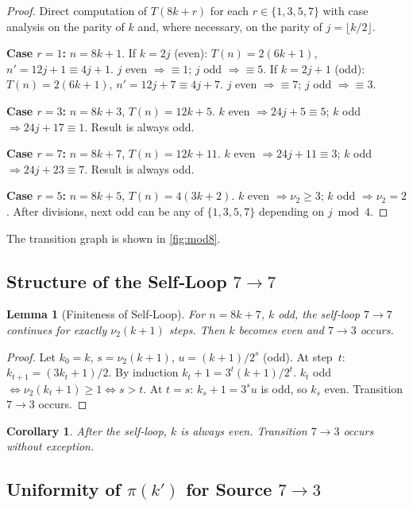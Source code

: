 \documentclass[12pt,a4paper]{article}
\newtheorem{lemma}[theorem]{Lemma}
\newtheorem{corollary}[theorem]{Corollary}
\theoremstyle{definition}
\theoremstyle{remark}
\begin{document}
\begin{proof}
Direct computation of $T(8k+r)$ for each $r\in\{1,3,5,7\}$ with case
analysis on the parity of $k$ and, where necessary, on the parity of
$j=\lfloor k/2\rfloor$.

\textbf{Case $r=1$:} $n=8k+1$.
If $k=2j$ (even): $T(n)=2(6k+1)$, $n'=12j+1\equiv4j+1$.
$j$ even $\Rightarrow\equiv1$; $j$ odd $\Rightarrow\equiv5$.
If $k=2j+1$ (odd): $T(n)=2(6k+1)$, $n'=12j+7\equiv4j+7$.
$j$ even $\Rightarrow\equiv7$; $j$ odd $\Rightarrow\equiv3$.

\textbf{Case $r=3$:} $n=8k+3$, $T(n)=12k+5$.
$k$ even $\Rightarrow24j+5\equiv5$; $k$ odd $\Rightarrow24j+17\equiv1$.
Result is always odd.

\textbf{Case $r=7$:} $n=8k+7$, $T(n)=12k+11$.
$k$ even $\Rightarrow24j+11\equiv3$; $k$ odd $\Rightarrow24j+23\equiv7$.
Result is always odd.

\textbf{Case $r=5$:} $n=8k+5$, $T(n)=4(3k+2)$.
$k$ even $\Rightarrow\nu_2\ge3$; $k$ odd $\Rightarrow\nu_2=2$.
After divisions, next odd can be any of $\{1,3,5,7\}$ depending on
$j\bmod4$.
\end{proof}

The transition graph is shown in \cref{fig:mod8}.

\subsection{Structure of the Self‑Loop $7\to7$}

\begin{lemma}[Finiteness of Self‑Loop]\label{lem:selfloop}
For $n=8k+7$, $k$ odd, the self‑loop $7\to7$ continues for exactly
$\nu_2(k+1)$ steps.
Then $k$ becomes even and $7\to3$ occurs.
\end{lemma}

\begin{proof}
Let $k_0=k$, $s=\nu_2(k+1)$, $u=(k+1)/2^s$ (odd).
At step~$t$: $k_{t+1}=(3k_t+1)/2$.
By induction $k_t+1=3^t(k+1)/2^t$.
$k_t$ odd $\iff\nu_2(k_t+1)\ge1\iff s>t$.
At $t=s$: $k_s+1=3^su$ is odd, so $k_s$ even.
Transition $7\to3$ occurs.
\end{proof}

\begin{corollary}\label{cor:selfloop}
After the self‑loop, $k$ is always even.
Transition $7\to3$ occurs without exception.
\end{corollary}

\subsection{Uniformity of $\pi(k')$ for Source $7\to3$}
\end{document}
